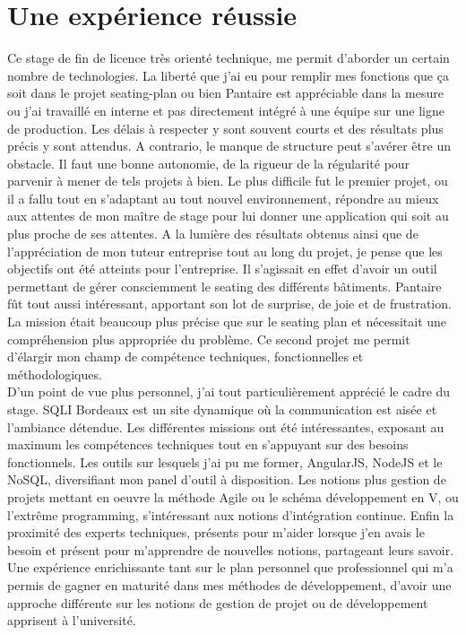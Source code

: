 \documentclass{report}
\newcommand{\jumpOne}{\\[1\baselineskip]}
\begin{document}
\chapter{Une expérience réussie} 
Ce stage de fin de licence très orienté technique, me permit d'aborder un certain nombre de technologies. La liberté que j'ai eu pour remplir mes fonctions que ça soit dans le projet seating-plan ou bien Pantaire est appréciable dans la mesure ou j'ai travaillé en interne et pas directement intégré à une équipe sur une ligne de production. Les délais à respecter y sont souvent courts et des résultats plus précis y sont attendus. A contrario, le manque de structure peut s'avérer être un obstacle. Il faut une bonne autonomie, de la rigueur de la régularité pour parvenir à mener de tels projets à bien. 
Le plus difficile fut le premier projet, ou il a fallu tout en s'adaptant au tout nouvel environnement, répondre au mieux aux attentes de mon maître de stage pour lui donner une application qui soit au plus proche de ses attentes. A la lumière des résultats obtenus ainsi que de l'appréciation de mon tuteur entreprise tout au long du projet, je pense que les objectifs ont été atteints pour l'entreprise. Il s'agissait en effet d'avoir un outil permettant de gérer consciemment le seating des différents bâtiments. 
Pantaire fût tout aussi intéressant, apportant son lot de surprise, de joie et de frustration. La mission était beaucoup plus précise que sur le seating plan et nécessitait une compréhension plus appropriée du problème. Ce second projet me permit d'élargir mon champ de compétence techniques, fonctionnelles et méthodologiques. 
\jumpOne
D'un point de vue plus personnel, j'ai tout particulièrement apprécié le cadre du stage. SQLI Bordeaux est un site dynamique où la communication est aisée et l'ambiance détendue.
Les différentes missions ont été intéressantes, exposant au maximum les compétences techniques tout en s'appuyant sur des besoins fonctionnels.
Les outils sur lesquels j'ai pu me former, AngularJS, NodeJS et le NoSQL, diversifiant mon panel d'outil à disposition.
Les notions plus gestion de projets mettant en oeuvre la méthode Agile ou le schéma développement en V, ou l'extrême programming, s'intéressant aux notions d'intégration continue. 
Enfin la proximité des experts techniques, présents pour m'aider lorsque j'en avais le besoin et présent pour m'apprendre de nouvelles notions, partageant leurs savoir. \\
Une expérience enrichissante tant sur le plan personnel que professionnel qui m'a permis de gagner en maturité dans mes méthodes de développement, d'avoir une approche différente sur les notions de gestion de projet ou de développement apprisent à l'université.
\end{document}
